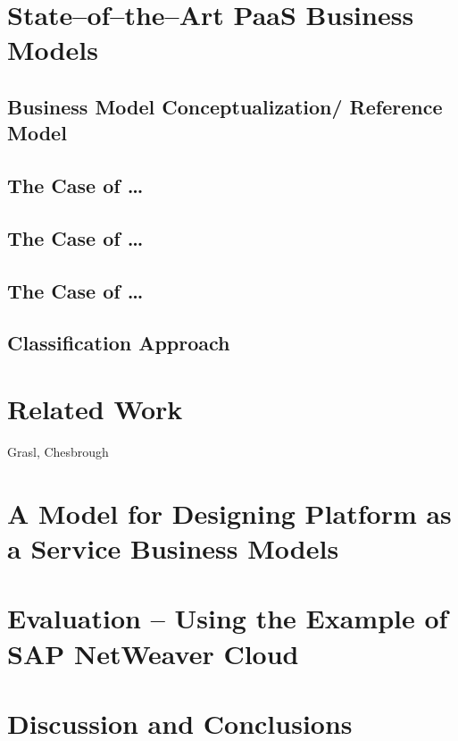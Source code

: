 	\citep{Johnson2008}

\chapter{State--of--the--Art PaaS Business Models}

	\section{Business Model Conceptualization/ Reference Model}
	
	\section{The Case of \ldots}
		\newpage
		
	\section{The Case of \ldots}
	\section{The Case of \ldots}
	
	\section{Classification Approach}
	
	\lipsum

\chapter{Related Work}
Grasl, Chesbrough


\chapter{A Model for Designing Platform as a Service Business Models}

\chapter{Evaluation -- Using the Example of SAP NetWeaver Cloud}

\chapter{Discussion and Conclusions}




